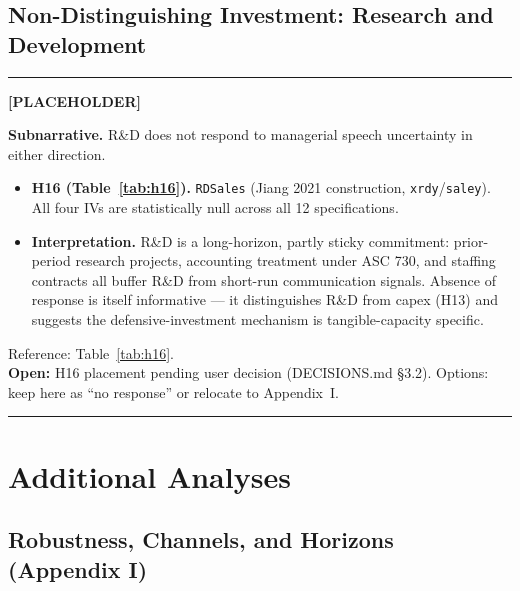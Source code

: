 \documentclass[11pt,a4paper,twocolumn]{article}
\newenvironment{placeholder}{%
  \par\medskip\noindent%
  {\color{placeholderaccent}\rule{\linewidth}{0.4pt}}\par%
  \noindent\textbf{\color{placeholderaccent}[PLACEHOLDER]}\par%
  \smallskip\itshape%
}{%
  \par\upshape\smallskip%
  {\color{placeholderaccent}\rule{\linewidth}{0.4pt}}\par\medskip%
}
\begin{document}
\subsection{Non-Distinguishing Investment: Research and Development}
\label{sec:rd}
\begin{placeholder}
\textbf{Subnarrative.} R\&D does not respond to managerial speech
uncertainty in either direction.
\begin{itemize}
  \item \textbf{H16 (Table~\ref{tab:h16}).} \texttt{RDSales} (Jiang 2021
        construction, \texttt{xrdy}/\texttt{saley}). All four IVs are
        statistically null across all 12 specifications.
  \item \textbf{Interpretation.} R\&D is a long-horizon, partly sticky
        commitment: prior-period research projects, accounting treatment
        under ASC 730, and staffing contracts all buffer R\&D from
        short-run communication signals. Absence of response is
        itself informative --- it distinguishes R\&D from capex
        (H13) and suggests the defensive-investment mechanism is
        tangible-capacity specific.
\end{itemize}
Reference: Table~\ref{tab:h16}.\\
\textbf{Open:} H16 placement pending user decision (DECISIONS.md
\S3.2). Options: keep here as ``no response'' or relocate to
Appendix~I.
\end{placeholder}

\clearpage

\section{Additional Analyses}
\label{sec:additional}

\subsection{Robustness, Channels, and Horizons (Appendix I)}
\label{sec:appI}
\end{document}
